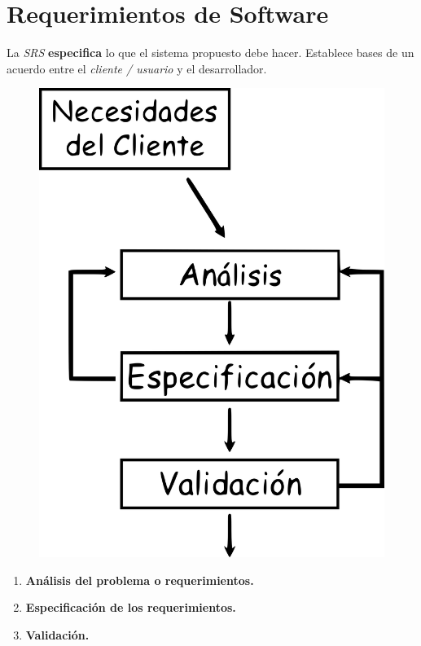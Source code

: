 \section{Requerimientos de Software}
  
  La \textit{SRS} \textbf{especifica} lo que el sistema propuesto debe hacer.
  \PN Establece bases de un acuerdo entre el \textit{cliente / usuario} y el desarrollador.

  \begin{figure}
    \includegraphics[scale=0.3]{graphics/figure_2.png}
  \end{figure}

  \PN{}
  \begin{enumerate}
    \item \textbf{Análisis del problema o requerimientos.}
    \item \textbf{Especificación de los requerimientos.}
    \item \textbf{Validación.}
  \end{enumerate}

